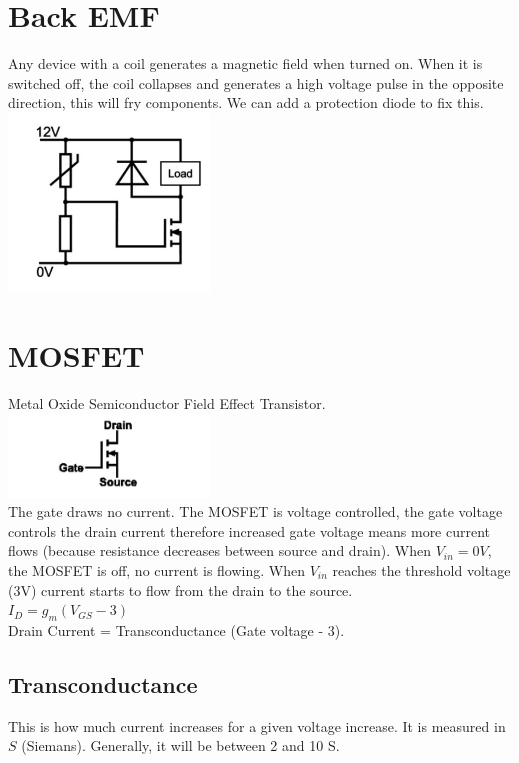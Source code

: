\documentclass[a4paper,11pt, twocolumn]{article}
\begin{document}
\section{Back EMF}
Any device with a coil generates a magnetic field when turned on. When it is switched off, the coil collapses and generates a high voltage pulse in the opposite direction, this will fry components. We can add a protection diode to fix this.\\
\includegraphics[width=0.4\textwidth]{backEMF.jpg}\\

\section{MOSFET}
Metal Oxide Semiconductor Field Effect Transistor.\\
\includegraphics[width=0.4\textwidth]{mosfet.jpg}\\
The gate draws no current. The MOSFET is voltage controlled, the gate voltage controls the drain current therefore increased gate voltage means more current flows (because resistance decreases between source and drain). When $V_{in}=0V$, the MOSFET is off, no current is flowing. When $V_{in}$ reaches the threshold voltage (3V) current starts to flow from the drain to the source.\\
$\displaystyle I_D = g_m(V_{GS} - 3)$\\
Drain Current = Transconductance (Gate voltage - 3).
\subsection{Transconductance}
This is how much current increases for a given voltage increase. It is measured in $S$ (Siemans). Generally, it will be between 2 and 10 S. 
\end{document}
